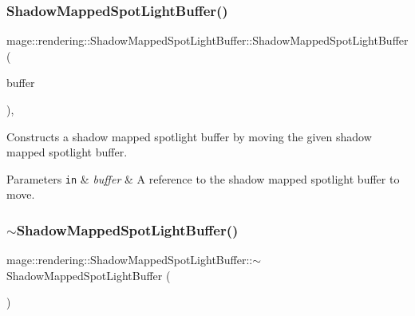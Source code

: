\subsubsection{\texorpdfstring{Shadow\+Mapped\+Spot\+Light\+Buffer()}{ShadowMappedSpotLightBuffer()}\hspace{0.1cm}{\footnotesize\ttfamily [3/3]}}
{\footnotesize\ttfamily mage\+::rendering\+::\+Shadow\+Mapped\+Spot\+Light\+Buffer\+::\+Shadow\+Mapped\+Spot\+Light\+Buffer (\begin{DoxyParamCaption}\item[{\mbox{\hyperlink{structmage_1_1rendering_1_1_shadow_mapped_spot_light_buffer}{Shadow\+Mapped\+Spot\+Light\+Buffer}} \&\&}]{buffer }\end{DoxyParamCaption})\hspace{0.3cm}{\ttfamily [default]}, {\ttfamily [noexcept]}}

Constructs a shadow mapped spotlight buffer by moving the given shadow mapped spotlight buffer.


\begin{DoxyParams}[1]{Parameters}
\mbox{\tt in}  & {\em buffer} & A reference to the shadow mapped spotlight buffer to move. \\
\hline
\end{DoxyParams}
\mbox{\label{structmage_1_1rendering_1_1_shadow_mapped_spot_light_buffer_ae651274fb4d113e173b62cb18191f1b9}} 
\subsubsection{\texorpdfstring{$\sim$\+Shadow\+Mapped\+Spot\+Light\+Buffer()}{~ShadowMappedSpotLightBuffer()}}
{\footnotesize\ttfamily mage\+::rendering\+::\+Shadow\+Mapped\+Spot\+Light\+Buffer\+::$\sim$\+Shadow\+Mapped\+Spot\+Light\+Buffer (\begin{DoxyParamCaption}{ }\end{DoxyParamCaption})\hspace{0.3cm}{\ttfamily [default]}}

